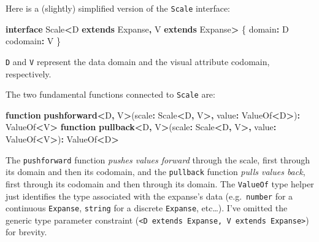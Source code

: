 \documentclass[
]{book}
\newenvironment{Shaded}{\begin{snugshade}}{\end{snugshade}}
\newcommand{\FunctionTok}[1]{\textcolor[rgb]{0.13,0.29,0.53}{\textbf{#1}}}
\newcommand{\KeywordTok}[1]{\textcolor[rgb]{0.13,0.29,0.53}{\textbf{#1}}}
\newcommand{\NormalTok}[1]{#1}
\newcommand{\OperatorTok}[1]{\textcolor[rgb]{0.81,0.36,0.00}{\textbf{#1}}}
\theoremstyle{definition}
\theoremstyle{definition}
\theoremstyle{definition}
\theoremstyle{definition}
\theoremstyle{remark}
\begin{document}
Here is a (slightly) simplified version of the \texttt{Scale} interface:

\begin{Shaded}
\begin{Highlighting}[]
\KeywordTok{interface}\NormalTok{ Scale}\OperatorTok{\textless{}}\NormalTok{D }\KeywordTok{extends}\NormalTok{ Expanse}\OperatorTok{,}\NormalTok{ V }\KeywordTok{extends}\NormalTok{ Expanse}\OperatorTok{\textgreater{}}\NormalTok{ \{}
\NormalTok{  domain}\OperatorTok{:}\NormalTok{ D}
\NormalTok{  codomain}\OperatorTok{:}\NormalTok{ V}
\NormalTok{\}}
\end{Highlighting}
\end{Shaded}

\texttt{D} and \texttt{V} represent the data domain and the visual attribute codomain, respectively.

The two fundamental functions connected to \texttt{Scale} are:

\begin{Shaded}
\begin{Highlighting}[]
\KeywordTok{function} \FunctionTok{pushforward}\OperatorTok{\textless{}}\NormalTok{D}\OperatorTok{,}\NormalTok{ V}\OperatorTok{\textgreater{}}\NormalTok{(scale}\OperatorTok{:}\NormalTok{ Scale}\OperatorTok{\textless{}}\NormalTok{D}\OperatorTok{,}\NormalTok{ V}\OperatorTok{\textgreater{},}\NormalTok{ value}\OperatorTok{:}\NormalTok{ ValueOf}\OperatorTok{\textless{}}\NormalTok{D}\OperatorTok{\textgreater{}}\NormalTok{)}\OperatorTok{:}\NormalTok{ ValueOf}\OperatorTok{\textless{}}\NormalTok{V}\OperatorTok{\textgreater{}}
\KeywordTok{function} \FunctionTok{pullback}\OperatorTok{\textless{}}\NormalTok{D}\OperatorTok{,}\NormalTok{ V}\OperatorTok{\textgreater{}}\NormalTok{(scale}\OperatorTok{:}\NormalTok{ Scale}\OperatorTok{\textless{}}\NormalTok{D}\OperatorTok{,}\NormalTok{ V}\OperatorTok{\textgreater{},}\NormalTok{ value}\OperatorTok{:}\NormalTok{ ValueOf}\OperatorTok{\textless{}}\NormalTok{V}\OperatorTok{\textgreater{}}\NormalTok{)}\OperatorTok{:}\NormalTok{ ValueOf}\OperatorTok{\textless{}}\NormalTok{D}\OperatorTok{\textgreater{}}
\end{Highlighting}
\end{Shaded}

The \texttt{pushforward} function \emph{pushes values forward} through the scale, first through its domain and then its codomain, and the \texttt{pullback} function \emph{pulls values back}, first through its codomain and then through its domain. The \texttt{ValueOf} type helper just identifies the type associated with the expanse's data (e.g.~\texttt{number} for a continuous \texttt{Expanse}, \texttt{string} for a discrete \texttt{Expanse}, etc\ldots). I've omitted the generic type parameter constraint (\texttt{\textless{}D\ extends\ Expanse,\ V\ extends\ Expanse\textgreater{}}) for brevity.
\end{document}

